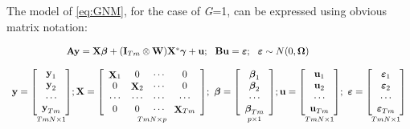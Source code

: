 \documentclass[article]{jss}
\begin{document}
The model of \eqref{eq:GNM}, for the case of \emph{G}=1, can be expressed using obvious matrix notation:

\begin{equation}
\begin{array}{ll}
\ \ \ \ \ \ \ \ \ \ \ \ \ \ \ \ \ {\bf Ay}={\bf X}{\boldsymbol \beta} + ({\bf I}_{Tm} \otimes {\bf W}){\bf X^*} {\boldsymbol \gamma} +{\bf u}; \ \ {\bf Bu}={\boldsymbol \varepsilon}; \ \ {\boldsymbol \varepsilon} \sim N(0,{\boldsymbol \Omega} )
\\
\\
{{\bf y}=\mathop{\left[\begin{array}{c} {\mathop{\bf y}\nolimits_{1}  } \\ {\mathop{\bf y}\nolimits_{2} } \\ {\cdots } \\ {\mathop{\bf y}\nolimits_{Tm} } \end{array}\right]}\limits_{TmN\times1} ;
{\bf X} =\mathop{\left[\begin{array}{cccc} {\mathop{\bf X}\nolimits_{1} } & {0} & {\cdots } & {0} \\ {0} & {\mathop{\bf X}\nolimits_{2} } & {\cdots } & {0} \\ {\cdots } & {\cdots } & {\cdots } & {\cdots } \\ {0} & {0} & {\cdots } & {\mathop{\bf X}\nolimits_{Tm} } \end{array}\right]}\limits_{TmN\times p} ;\, \, {\boldsymbol \beta} =\mathop{\left[\begin{array}{c} {\mathop{{\boldsymbol \beta}}\nolimits_{1} } \\ {\mathop{{\boldsymbol \beta}}\nolimits_{2} } \\ {\cdots } \\ {\mathop{{\boldsymbol \beta}}\nolimits_{Tm} } \end{array}\right]}\limits_{p\times 1} ;{\bf u}=\mathop{\left[\begin{array}{c} {\mathop{{\bf u}}\nolimits_{1} } \\ {\mathop{{\bf u}}\nolimits_{2} } \\ {\cdots } \\ {\mathop{{\bf u}}\nolimits_{Tm} } \end{array}\right]}\limits_{TmN\times1} ;\, \, {\boldsymbol \varepsilon} =\mathop{\left[\begin{array}{c} {\mathop{{\boldsymbol \varepsilon}}\nolimits_{1} } \\ {\mathop{{\boldsymbol \varepsilon}}\nolimits_{2} } \\ {\cdots } \\ {\mathop{{\boldsymbol \varepsilon}}\nolimits_{Tm} } \end{array}\right]}\limits_{TmN\times1} }
\end{array}
 \label{eq:pool}
\end{equation}
\end{document}
